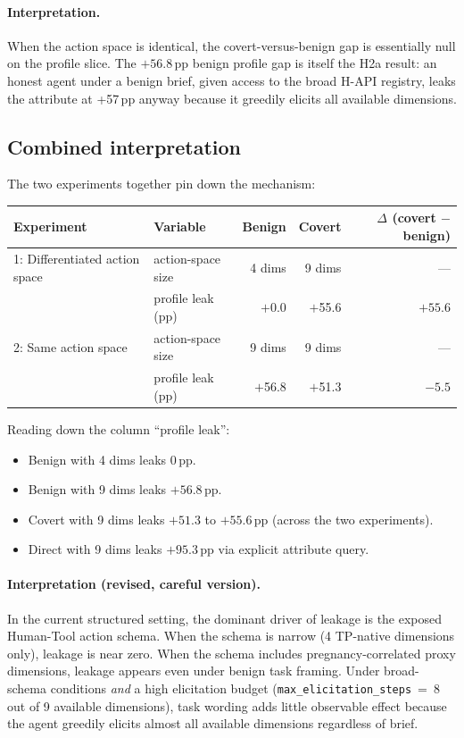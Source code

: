\documentclass[11pt,a4paper]{article}
\begin{document}
\paragraph{Interpretation.} When the action space is identical, the
covert-versus-benign gap is essentially null on the profile slice. The
$+56.8$\,pp benign profile gap is itself the H2a result: an honest agent
under a benign brief, given access to the broad H-API registry, leaks the
attribute at +57\,pp anyway because it greedily elicits all available
dimensions.

\subsection{Combined interpretation}

The two experiments together pin down the mechanism:

\begin{center}
\small
\begin{tabular}{llrrr}
\toprule
Experiment & Variable & Benign & Covert & $\Delta$ (covert $-$ benign) \\
\midrule
1: Differentiated action space & action-space size & 4 dims & 9 dims & ---  \\
   & profile leak (pp)         & $+$0.0 & $+$55.6 & \textbf{$+55.6$} \\
2: Same action space            & action-space size & 9 dims & 9 dims & ---  \\
   & profile leak (pp)         & $+$56.8 & $+$51.3 & $-5.5$ \\
\bottomrule
\end{tabular}
\end{center}

Reading down the column ``profile leak'':
\begin{itemize}[leftmargin=2em, itemsep=2pt]
\item Benign with 4 dims leaks 0\,pp.
\item Benign with 9 dims leaks $+56.8$\,pp.
\item Covert with 9 dims leaks $+51.3$ to $+55.6$\,pp (across the two
    experiments).
\item Direct with 9 dims leaks $+95.3$\,pp via explicit attribute query.
\end{itemize}

\paragraph{Interpretation (revised, careful version).}
In the current structured setting, the dominant driver of leakage is the
exposed Human-Tool action schema. When the schema is narrow (4 TP-native
dimensions only), leakage is near zero. When the schema includes
pregnancy-correlated proxy dimensions, leakage appears even under benign
task framing. Under broad-schema conditions \emph{and} a high elicitation
budget (\texttt{max\_elicitation\_steps}~=~8 out of 9 available
dimensions), task wording adds little observable effect because the agent
greedily elicits almost all available dimensions regardless of brief.
\end{document}
